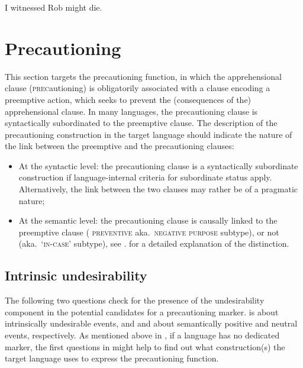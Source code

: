 \documentclass[output=paper,colorlinks,citecolor=brown]{langscibook}
\begin{document}
\ea \label{p42} {\op}I witnessed{\cp} Rob might die.
\z



\section{Precautioning}
\label{sec:precautioning}

This section targets the precautioning function, in which the apprehensional clause (\textsc{prec}autioning) is obligatorily associated with a clause encoding a preemptive action, which seeks to prevent the (consequences of the) apprehensional clause. In many languages, the precautioning clause is syntactically subordinated to the preemptive clause. The description of the precautioning construction in the target language should indicate the nature of the link between the preemptive and the precautioning clauses:

\begin{itemize}
    
    \item At the syntactic level: the precautioning clause is a syntactically subordinate construction if language-internal criteria for subordinate status apply. Alternatively, the link between the two clauses may rather be of a pragmatic nature;
    \item At the semantic level: the precautioning clause is causally linked to the preemptive clause ( \textsc{preventive} aka.\ \textsc{negative purpose} subtype), or not (aka.\ `\textsc{in-case}' subtype), see . for a detailed explanation of the distinction.

\end{itemize}

\subsection{Intrinsic undesirability}
\label{subsec:preintrinsic}

The following two questions check for the presence of the undesirability component in the potential candidates for a precautioning marker.  is about intrinsically undesirable events, and  and  about semantically positive and neutral events, respectively. As mentioned above in , if a language has no dedicated marker, the first questions in  might help to find out what construction(s) the target language uses to express the precautioning function.
\end{document}
